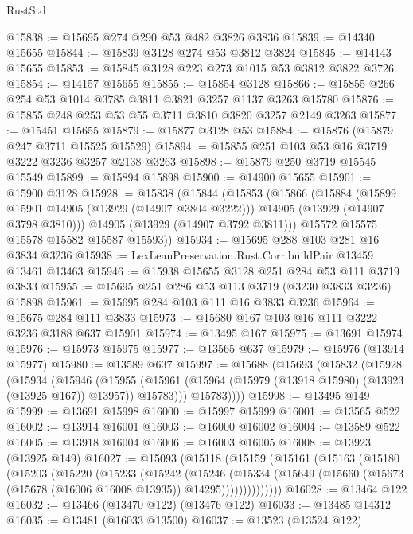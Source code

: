 \begin{lexlean}{RustStd}
\begin{coremodule}
{\begin{coremodule}
{{{{{{{{{{{{{{{{{{{{{{{{{{{{{{{{{{{{{@15838 := @15695 @274 @290 @53 @482 @3826 @3836
@15839 := @14340 @15655
@15844 := @15839 @3128 @274 @53 @3812 @3824
@15845 := @14143 @15655
@15853 := @15845 @3128 @223 @273 @1015 @53 @3812 @3822 @3726
@15854 := @14157 @15655
@15855 := @15854 @3128
@15866 := @15855 @266 @254 @53 @1014 @3785 @3811 @3821 @3257 @1137 @3263 @15780
@15876 := @15855 @248 @253 @53 @55 @3711 @3810 @3820 @3257 @2149 @3263
@15877 := @15451 @15655
@15879 := @15877 @3128 @53
@15884 := @15876 (@15879 @247 @3711 @15525 @15529)
@15894 := @15855 @251 @103 @53 @16 @3719 @3222 @3236 @3257 @2138 @3263
@15898 := @15879 @250 @3719 @15545 @15549
@15899 := @15894 @15898
@15900 := @14900 @15655
@15901 := @15900 @3128
@15928 := @15838
    (@15844
      (@15853
        (@15866
          (@15884
            (@15899 @15901 @14905 (@13929 (@14907 @3804 @3222)))
            @14905
            (@13929 (@14907 @3798 @3810)))
          @14905
          (@13929 (@14907 @3792 @3811)))
        @15572
        @15575
        @15578
        @15582
        @15587
        @15593))
@15934 := @15695 @288 @103 @281 @16 @3834 @3236
@15938 := LexLeanPreservation.Rust.Corr.buildPair @13459 @13461 @13463
@15946 := @15938 @15655 @3128 @251 @284 @53 @111 @3719 @3833
@15955 := @15695 @251 @286 @53 @113 @3719 (@3230 @3833 @3236) @15898
@15961 := @15695 @284 @103 @111 @16 @3833 @3236
@15964 := @15675 @284 @111 @3833
@15973 := @15680 @167 @103 @16 @111 @3222 @3236 @3188 @637 @15901
@15974 := @13495 @167
@15975 := @13691 @15974
@15976 := @15973 @15975
@15977 := @13565 @637
@15979 := @15976 (@13914 @15977)
@15980 := @13589 @637
@15997 := @15688
    (@15693
      (@15832
        (@15928
          (@15934
            (@15946
              (@15955
                (@15961 (@15964 (@15979 (@13918 @15980) (@13923 (@13925 @167)) @13957)) @15783)))
            @15783))))
@15998 := @13495 @149
@15999 := @13691 @15998
@16000 := @15997 @15999
@16001 := @13565 @522
@16002 := @13914 @16001
@16003 := @16000 @16002
@16004 := @13589 @522
@16005 := @13918 @16004
@16006 := @16003 @16005
@16008 := @13923 (@13925 @149)
@16027 := @15093
    (@15118
      (@15159
        (@15161
          (@15163
            (@15180
              (@15203
                (@15220
                  (@15233
                    (@15242
                      (@15246
                        (@15334
                          (@15649
                            (@15660 (@15673 (@15678 (@16006 @16008 @13935)) @14295))))))))))))))
@16028 := @13464 @122
@16032 := @13466 (@13470 @122) (@13476 @122)
@16033 := @13485 @14312
@16035 := @13481 (@16033 @13500)
@16037 := @13523 (@13524 @122)
}}}}}}}}}}}}}}}}}}}}}}}}}}}}}}}}}}}}}
\end{coremodule}}
\end{coremodule}
\end{lexlean}
